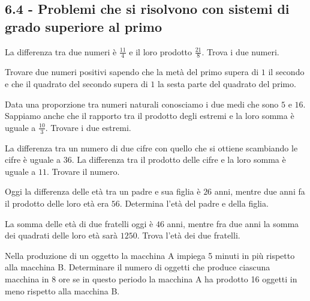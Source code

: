 \subsection*{6.4 - Problemi che si risolvono con sistemi di grado superiore al primo}
\begin{multicols}{2}
\begin{esercizio}[\Ast]
 \label{ese:6.49}
La differenza tra due numeri è $\frac {11} 4$ e il loro prodotto $\frac {21} 8$. Trova i due numeri.
\end{esercizio}

\begin{esercizio}[\Ast]
 \label{ese:6.50}
Trovare due numeri positivi sapendo che la metà del primo supera di $ 1 $ il secondo e che il quadrato del secondo supera di $ 1 $ la sesta parte del quadrato del primo.
\end{esercizio}

\begin{esercizio}[\Ast]
 \label{ese:6.51}
Data una proporzione tra numeri naturali conosciamo i due medi che sono $ 5 $ e $ 16 $. Sappiamo anche che il rapporto tra il prodotto degli estremi e la loro somma è uguale a $\frac {10} 3 $. Trovare i due estremi.
\end{esercizio}

\begin{esercizio}[\Ast]
 \label{ese:6.52}
La differenza tra un numero di due cifre con quello che si ottiene scambiando le cifre è uguale a $ 36 $. La differenza tra il prodotto delle cifre e la loro somma è uguale a $ 11 $. Trovare il numero.
\end{esercizio}

\begin{esercizio}[\Ast]
 \label{ese:6.53}
Oggi la differenza delle età tra un padre e sua figlia è $ 26 $ anni, mentre due anni fa il prodotto delle loro età era $ 56 $. Determina l'età del padre e della figlia.
\end{esercizio}

\begin{esercizio}[\Ast]
 \label{ese:6.54}
La somma delle età di due fratelli oggi è $ 46 $ anni, mentre fra due anni la somma dei quadrati delle loro età sarà $ 1250 $. Trova l'età dei due fratelli.
\end{esercizio}

\begin{esercizio}[\Ast]
 \label{ese:6.55}
Nella produzione di un oggetto la macchina A impiega 5 minuti in più rispetto alla macchina B. Determinare il numero di oggetti che produce ciascuna macchina in 8 ore se in questo periodo la macchina A ha prodotto 16 oggetti in meno rispetto alla macchina B.
\end{esercizio}


\end{multicols}
